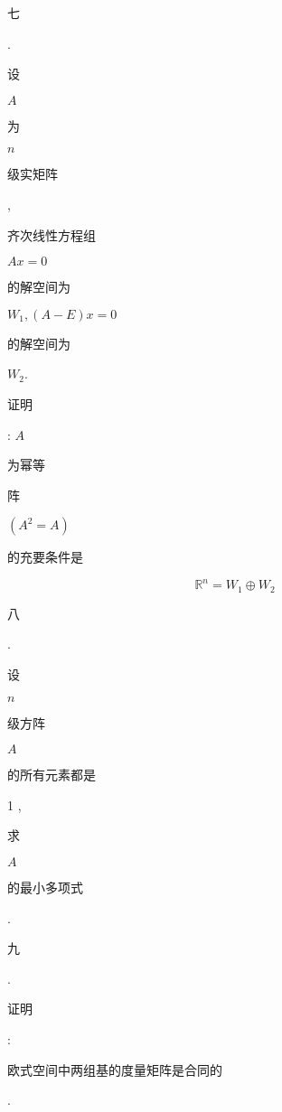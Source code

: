 \documentclass[10pt]{article}
\begin{document}
\begin{CJK}{UTF8}{mj}七\end{CJK}. \begin{CJK}{UTF8}{mj}设\end{CJK} $A$ \begin{CJK}{UTF8}{mj}为\end{CJK} $n$ \begin{CJK}{UTF8}{mj}级实矩阵\end{CJK}, \begin{CJK}{UTF8}{mj}齐次线性方程组\end{CJK} $A x=0$ \begin{CJK}{UTF8}{mj}的解空间为\end{CJK} $W_{1},(A-E) x=0$ \begin{CJK}{UTF8}{mj}的解空间为\end{CJK} $W_{2}$. \begin{CJK}{UTF8}{mj}证明\end{CJK}: $A$ \begin{CJK}{UTF8}{mj}为幂等\end{CJK} \begin{CJK}{UTF8}{mj}阵\end{CJK} $\left(A^{2}=A\right)$ \begin{CJK}{UTF8}{mj}的充要条件是\end{CJK}
$$
\mathbb{R}^{n}=W_{1} \oplus W_{2}
$$
\begin{CJK}{UTF8}{mj}八\end{CJK}. \begin{CJK}{UTF8}{mj}设\end{CJK} $n$ \begin{CJK}{UTF8}{mj}级方阵\end{CJK} $A$ \begin{CJK}{UTF8}{mj}的所有元素都是\end{CJK} 1 , \begin{CJK}{UTF8}{mj}求\end{CJK} $A$ \begin{CJK}{UTF8}{mj}的最小多项式\end{CJK}.

\begin{CJK}{UTF8}{mj}九\end{CJK}. \begin{CJK}{UTF8}{mj}证明\end{CJK}: \begin{CJK}{UTF8}{mj}欧式空间中两组基的度量矩阵是合同的\end{CJK}.
\end{document}
